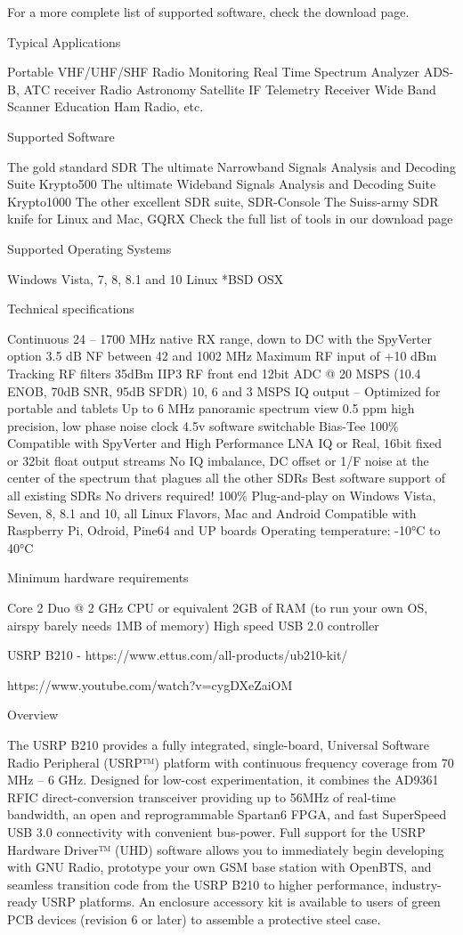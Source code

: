 \documentclass[
  12pt,				%
  openright,			%
  twoside,			%
  a4paper,			%
  english,			%
  french,				%
  spanish,			%
  brazil,				%
  ]{abntex2}
\begin{document}
For a more complete list of supported software, check the download page.

Typical Applications

Portable VHF/UHF/SHF Radio Monitoring
Real Time Spectrum Analyzer
ADS-B, ATC receiver
Radio Astronomy
Satellite IF
Telemetry Receiver
Wide Band Scanner
Education
Ham Radio, etc.

Supported Software

The gold standard SDR
The ultimate Narrowband Signals Analysis and Decoding Suite Krypto500
The ultimate Wideband Signals Analysis and Decoding Suite Krypto1000
The other excellent SDR suite, SDR-Console
The Suiss-army SDR knife for Linux and Mac, GQRX
Check the full list of tools in our download page

Supported Operating Systems

Windows Vista, 7, 8, 8.1 and 10
Linux
*BSD
OSX

Technical specifications

Continuous 24 – 1700 MHz native RX range, down to DC with the SpyVerter option
3.5 dB NF between 42 and 1002 MHz
Maximum RF input of +10 dBm
Tracking RF filters
35dBm IIP3 RF front end
12bit ADC @ 20 MSPS (10.4 ENOB, 70dB SNR, 95dB SFDR)
10, 6 and 3 MSPS IQ output – Optimized for portable and tablets
Up to 6 MHz panoramic spectrum view
0.5 ppm high precision, low phase noise clock
4.5v software switchable Bias-Tee 100\% Compatible with SpyVerter and High Performance LNA
IQ or Real, 16bit fixed or 32bit float output streams
No IQ imbalance, DC offset or 1/F noise at the center of the spectrum that plagues all the other SDRs
Best software support of all existing SDRs
No drivers required! 100\% Plug-and-play on Windows Vista, Seven, 8, 8.1 and 10, all Linux Flavors, Mac and Android
Compatible with Raspberry Pi, Odroid, Pine64 and UP boards
Operating temperature: -10°C to 40°C

Minimum hardware requirements

Core 2 Duo @ 2 GHz CPU or equivalent
2GB of RAM (to run your own OS, airspy barely needs 1MB of memory)
High speed USB 2.0 controller


USRP B210 - https://www.ettus.com/all-products/ub210-kit/

https://www.youtube.com/watch?v=cygDXeZaiOM

Overview

The USRP B210 provides a fully integrated, single-board, Universal Software Radio Peripheral (USRP™) platform with continuous frequency coverage from 70 MHz – 6 GHz. Designed for low-cost experimentation, it combines the AD9361 RFIC direct-conversion transceiver providing up to 56MHz of real-time bandwidth, an open and reprogrammable Spartan6 FPGA, and fast SuperSpeed USB 3.0 connectivity with convenient bus-power. Full support for the USRP Hardware Driver™ (UHD) software allows you to immediately begin developing with GNU Radio, prototype your own GSM base station with OpenBTS, and seamless transition code from the USRP B210 to higher performance, industry-ready USRP platforms. An enclosure accessory kit is available to users of green PCB devices (revision 6 or later) to assemble a protective steel case.
\end{document}
